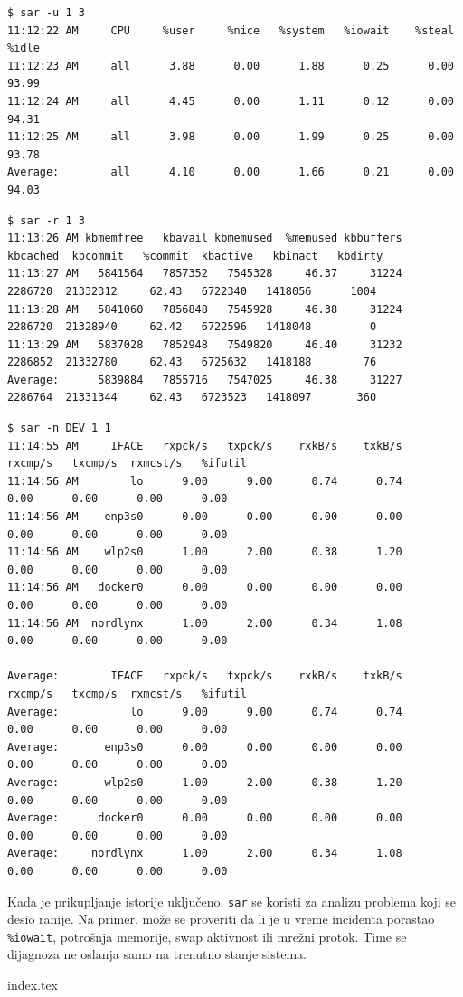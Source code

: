 \begin{verbatim}
$ sar -u 1 3
11:12:22 AM     CPU     %user     %nice   %system   %iowait    %steal     %idle
11:12:23 AM     all      3.88      0.00      1.88      0.25      0.00     93.99
11:12:24 AM     all      4.45      0.00      1.11      0.12      0.00     94.31
11:12:25 AM     all      3.98      0.00      1.99      0.25      0.00     93.78
Average:        all      4.10      0.00      1.66      0.21      0.00     94.03
\end{verbatim}

\begin{verbatim}
$ sar -r 1 3
11:13:26 AM kbmemfree   kbavail kbmemused  %memused kbbuffers  kbcached  kbcommit   %commit  kbactive   kbinact   kbdirty
11:13:27 AM   5841564   7857352   7545328     46.37     31224   2286720  21332312     62.43   6722340   1418056      1004
11:13:28 AM   5841060   7856848   7545928     46.38     31224   2286720  21328940     62.42   6722596   1418048         0
11:13:29 AM   5837028   7852948   7549820     46.40     31232   2286852  21332780     62.43   6725632   1418188        76
Average:      5839884   7855716   7547025     46.38     31227   2286764  21331344     62.43   6723523   1418097       360
\end{verbatim}

\begin{verbatim}
$ sar -n DEV 1 1
11:14:55 AM     IFACE   rxpck/s   txpck/s    rxkB/s    txkB/s   rxcmp/s   txcmp/s  rxmcst/s   %ifutil
11:14:56 AM        lo      9.00      9.00      0.74      0.74      0.00      0.00      0.00      0.00
11:14:56 AM    enp3s0      0.00      0.00      0.00      0.00      0.00      0.00      0.00      0.00
11:14:56 AM    wlp2s0      1.00      2.00      0.38      1.20      0.00      0.00      0.00      0.00
11:14:56 AM   docker0      0.00      0.00      0.00      0.00      0.00      0.00      0.00      0.00
11:14:56 AM  nordlynx      1.00      2.00      0.34      1.08      0.00      0.00      0.00      0.00

Average:        IFACE   rxpck/s   txpck/s    rxkB/s    txkB/s   rxcmp/s   txcmp/s  rxmcst/s   %ifutil
Average:           lo      9.00      9.00      0.74      0.74      0.00      0.00      0.00      0.00
Average:       enp3s0      0.00      0.00      0.00      0.00      0.00      0.00      0.00      0.00
Average:       wlp2s0      1.00      2.00      0.38      1.20      0.00      0.00      0.00      0.00
Average:      docker0      0.00      0.00      0.00      0.00      0.00      0.00      0.00      0.00
Average:     nordlynx      1.00      2.00      0.34      1.08      0.00      0.00      0.00      0.00
\end{verbatim}

Kada je prikupljanje istorije uključeno, \texttt{sar} se koristi za analizu problema koji se desio ranije. Na primer, može se proveriti da li je u vreme incidenta porastao \texttt{\%iowait}, potrošnja memorije, swap aktivnost ili mrežni protok. Time se dijagnoza ne oslanja samo na trenutno stanje sistema.

{index.tex}
